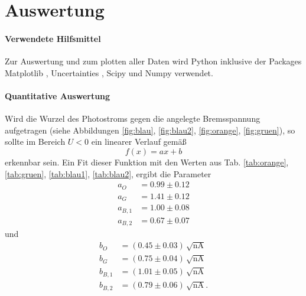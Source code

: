 \section{Auswertung}
\label{sec:Auswertung}
\paragraph{Verwendete Hilfsmittel}
Zur Auswertung und zum plotten aller Daten wird Python \cite{python} inklusive der Packages Matplotlib \cite{matplotlib}, Uncertainties \cite{uncertainties}, Scipy \cite{scipy} und Numpy \cite{numpy} verwendet.

\paragraph{Quantitative Auswertung}
Wird die Wurzel des Photostroms gegen die angelegte Bremsspannung aufgetragen (siehe Abbildungen \ref{fig:blau}, \ref{fig:blau2}, \ref{fig:orange}, \ref{fig:gruen}), so sollte im Bereich $U < 0$ ein linearer Verlauf gemäß
\begin{equation}
  f(x) = ax+b
  \label{eqn:lin}
\end{equation}
erkennbar sein. Ein Fit dieser Funktion mit den Werten aus Tab. \ref{tab:orange}, \ref{tab:gruen}, \ref{tab:blau1}, \ref{tab:blau2}, ergibt die Parameter
\begin{align*}
  a_O &= 0.99 \pm 0.12\\
  a_G &= 1.41 \pm 0.12 \\
  a_{B,1} &= 1.00 \pm 0.08 \\
  a_{B,2} &= 0.67 \pm 0.07
\end{align*}
und
\begin{align*}
  b_O &= (0.45 \pm 0.03) \, \sqrt{\si{\nano \ampere}} \\
  b_G &= (0.75 \pm 0.04) \, \sqrt{\si{\nano \ampere}} \\
  b_{B,1} &= (1.01 \pm 0.05) \, \sqrt{\si{\nano \ampere}} \\
  b_{B,2} &= (0.79 \pm 0.06) \, \sqrt{\si{\nano \ampere}}.
\end{align*}

